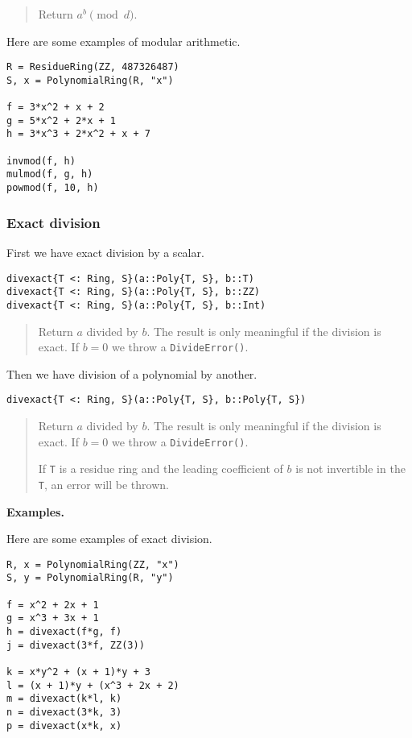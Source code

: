 \documentclass[a4paper,10pt]{article}
\newcommand{\code}{\lstinline}
\newcommand{\desc}[1]{\vspace{-3mm}\begin{quote}#1\end{quote}}
\begin{document}
{{{\desc{Return $a^b \pmod{d}$.}

Here are some examples of modular arithmetic.

\begin{lstlisting}
R = ResidueRing(ZZ, 487326487)
S, x = PolynomialRing(R, "x")

f = 3*x^2 + x + 2
g = 5*x^2 + 2*x + 1
h = 3*x^3 + 2*x^2 + x + 7

invmod(f, h)
mulmod(f, g, h)
powmod(f, 10, h)
\end{lstlisting}

\subsubsection{Exact division}

First we have exact division by a scalar.

\begin{lstlisting}
divexact{T <: Ring, S}(a::Poly{T, S}, b::T)
divexact{T <: Ring, S}(a::Poly{T, S}, b::ZZ)
divexact{T <: Ring, S}(a::Poly{T, S}, b::Int)
\end{lstlisting}

\desc{Return $a$ divided by $b$. The result is only meaningful if the division is
exact. If $b = 0$ we throw a \code{DivideError()}.}

Then we have division of a polynomial by another.

\begin{lstlisting}
divexact{T <: Ring, S}(a::Poly{T, S}, b::Poly{T, S})
\end{lstlisting}

\desc{Return $a$ divided by $b$. The result is only meaningful if the division is
exact. If $b = 0$ we throw a \code{DivideError()}. 

If \code{T} is a residue ring and the leading coefficient of $b$ is not invertible
in the \code{T}, an error will be thrown.} 

\textbf{Examples.}

Here are some examples of exact division.

\begin{lstlisting}
R, x = PolynomialRing(ZZ, "x")
S, y = PolynomialRing(R, "y")

f = x^2 + 2x + 1
g = x^3 + 3x + 1
h = divexact(f*g, f)
j = divexact(3*f, ZZ(3))

k = x*y^2 + (x + 1)*y + 3
l = (x + 1)*y + (x^3 + 2x + 2)
m = divexact(k*l, k)
n = divexact(3*k, 3)
p = divexact(x*k, x)
\end{lstlisting}

}}}
\end{document}

